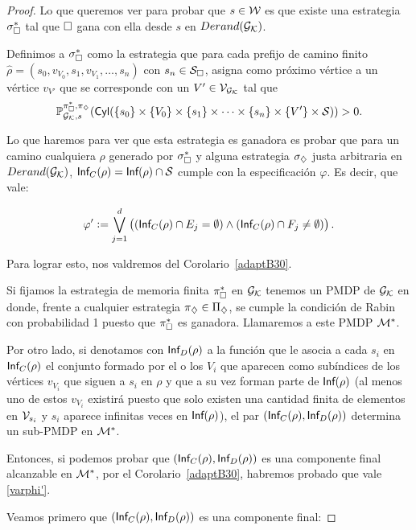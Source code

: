 \begin{proof}
	Lo que queremos ver para probar que $s \in \mathcal{W}$ es que existe una estrategia
	$\sigma_\square^*$ tal que $\square$ gana con ella desde $s$ en $Derand(\mathcal{G}_{\mathcal{K}})$.

	Definimos a $\sigma_\square^*$ como la estrategia que para cada prefijo de camino
	finito \\ $\hat \rho = (s_0, v_{V_0}, s_1, v_{V_1}, \dots, s_n)$ con $s_n \in
		\mathcal{S}_\square$, asigna como próximo vértice a un vértice $v_{V'}$ que se
	corresponde con un $V' \in \mathcal{V}_{\mathcal{G}_{\mathcal{K}}}$ tal que $$\mathbb{P}^{\pi_\square^*, \pi_\diamondsuit}_{\mathcal{G}_{\mathcal{K}},
		s}(\textsf{Cyl}(\{s_0\} \times \{V_0\} \times \{s_1\} \times \dots \times \{s_n\}
		\times \{V'\} \times \mathcal{S})) > 0.$$

	Lo que haremos para ver que esta estrategia es ganadora es probar que para un
	camino cualquiera $\rho$ generado por $\sigma_\square^*$ y alguna estrategia
	$\sigma_\diamondsuit$ justa arbitraria en $Derand(\mathcal{G}_{\mathcal{K}})$, $\textsf{Inf}_C(\rho) = \textsf{Inf}(\rho) \cap \mathcal{S}$
	cumple con la especificación $\varphi$. Es decir, que vale:

	\begin{equation}
		\label{varphi'}
		\varphi' := \bigvee_{j = 1}^{d} \left((\textsf{Inf}_C(\rho) \cap E_j = \emptyset) \wedge (\textsf{Inf}_C(\rho) \cap F_j \neq \emptyset)  \right).
	\end{equation}

	Para lograr esto, nos valdremos del Corolario~\ref{adaptB30}.

	Si fijamos la estrategia de memoria finita $\pi_\square^*$ en $\mathcal{G}_{\mathcal{K}}$ tenemos un PMDP
	de $\mathcal{G}_{\mathcal{K}}$ en donde, frente a cualquier estrategia $\pi_\diamondsuit\in \Pi_\diamondsuit$, se
	cumple la condición de Rabin con probabilidad 1 puesto que $\pi_\square^*$ es
	ganadora. Llamaremos a este PMDP $\mathcal{M}^*$.

	Por otro lado, si denotamos con $\textsf{Inf}_D(\rho)$ a la función que le asocia a
	cada $s_i$ en $\textsf{Inf}_C(\rho)$ el conjunto formado por el o los $V_i$ que
	aparecen como subíndices de los vértices $v_{V_i}$ que siguen a $s_i$ en $\rho$
	y que a su vez forman parte de $\textsf{Inf}(\rho)$ (al menos uno de estos $v_{V_i}$
	existirá puesto que solo existen una cantidad finita de elementos en $\mathcal{V}_{s_i}$ y
	$s_i$ aparece infinitas veces en $\textsf{Inf}(\rho)$), el par $(\textsf{Inf}_C(\rho),
		\textsf{Inf}_D(\rho))$ determina un sub-PMDP en $\mathcal{M}^*$.

	Entonces, si podemos probar que $(\textsf{Inf}_C(\rho), \textsf{Inf}_D(\rho))$ es una
	componente final alcanzable en $\mathcal{M}^*$, por el Corolario~\ref{adaptB30},
	habremos probado que vale \ref{varphi'}.

	Veamos primero que $(\textsf{Inf}_C(\rho), \textsf{Inf}_D(\rho))$ es una componente final:


\end{proof}
